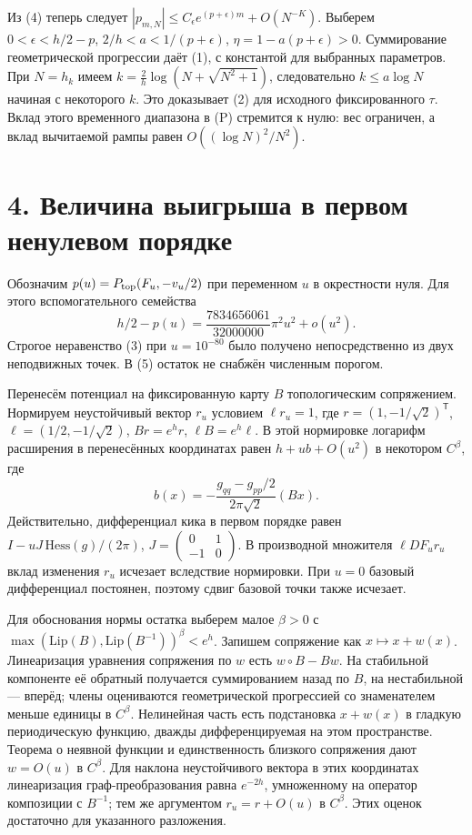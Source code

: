 \documentclass[11pt,a4paper]{article}
\newcommand{\sect}[1]{\section*{\sffamily\color{ink}#1}}
\begin{document}
Из (4) теперь следует $|p_{m,N}|\le C_\epsilon e^{(p+\epsilon)m}+O(N^{-K})$. Выберем $0<\epsilon<h/2-p$, $2/h<a<1/(p+\epsilon)$, $\eta=1-a(p+\epsilon)>0$. Суммирование геометрической прогрессии даёт (1), с константой для выбранных параметров. При $N=h_k$ имеем $k=\frac2h\log(N+\sqrt{N^2+1})$, следовательно $k\le a\log N$ начиная с некоторого $k$. Это доказывает (2) для исходного фиксированного $\tau$. Вклад этого временного диапазона в (P) стремится к нулю: вес ограничен, а вклад вычитаемой рампы равен $O((\log N)^2/N^2)$.
\newpage
\sect{4. Величина выигрыша в первом ненулевом порядке}
Обозначим $p(u)=P_{\rm top}(F_u,-v_u/2)$ при переменном $u$ в окрестности нуля. Для этого вспомогательного семейства
\[
 h/2-p(u)=\frac{7834656061}{32000000}\pi^2u^2+o(u^2).                   \tag{5}
\]
Строгое неравенство (3) при $u=10^{-80}$ было получено непосредственно из двух неподвижных точек. В (5) остаток не снабжён численным порогом.

Перенесём потенциал на фиксированную карту $B$ топологическим сопряжением. Нормируем неустойчивый вектор $r_u$ условием $\ell r_u=1$, где $r=(1,-1/\sqrt2)^{\mathsf T}$, $\ell=(1/2,-1/\sqrt2)$, $Br=e^hr$, $\ell B=e^h\ell$. В этой нормировке логарифм расширения в перенесённых координатах равен $h+u b+O(u^2)$ в некотором $C^\beta$, где
\[
 b(x)= -\frac{g_{qq}-g_{pp}/2}{2\pi\sqrt2}(Bx).
\]
Действительно, дифференциал кика в первом порядке равен $I-uJ\,\mathrm{Hess}(g)/(2\pi)$, $J=\left(\begin{smallmatrix}0&1\\-1&0\end{smallmatrix}\right)$. В производной множителя $\ell DF_u r_u$ вклад изменения $r_u$ исчезает вследствие нормировки. При $u=0$ базовый дифференциал постоянен, поэтому сдвиг базовой точки также исчезает.

Для обоснования нормы остатка выберем малое $\beta>0$ с $\max(\mathrm{Lip}(B),\mathrm{Lip}(B^{-1}))^\beta<e^h$. Запишем сопряжение как $x\mapsto x+w(x)$. Линеаризация уравнения сопряжения по $w$ есть $w\circ B-Bw$. На стабильной компоненте её обратный получается суммированием назад по $B$, на нестабильной --- вперёд; члены оцениваются геометрической прогрессией со знаменателем меньше единицы в $C^\beta$. Нелинейная часть есть подстановка $x+w(x)$ в гладкую периодическую функцию, дважды дифференцируемая на этом пространстве. Теорема о неявной функции и единственность близкого сопряжения дают $w=O(u)$ в $C^\beta$. Для наклона неустойчивого вектора в этих координатах линеаризация граф-преобразования равна $e^{-2h}$, умноженному на оператор композиции с $B^{-1}$; тем же аргументом $r_u=r+O(u)$ в $C^\beta$. Этих оценок достаточно для указанного разложения.
\end{document}
